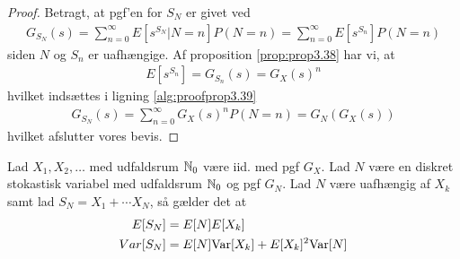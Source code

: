 \begin{proof}
Betragt, at pgf'en for $S_N$ er givet ved
    \begin{align}\label{alg:proofprop3.39}
        G_{S_N}(s)=\sum_{n=0}^{\infty}E\left[s^{S_N} | N=n\right]P(N=n)=\sum_{n=0}^{\infty}E[s^{S_n}]P(N=n)
    \end{align}
siden $N$ og $S_n$ er uafhængige. Af proposition \ref{prop:prop3.38} har vi, at 
    \begin{align*}
        E[s^{S_n}] = G_{S_{n}}(s) =G_X(s)^n
    \end{align*}
    hvilket indsættes i ligning \eqref{alg:proofprop3.39}
    \begin{align*}
        G_{S_N}(s)=\sum_{n=0}^{\infty} G_X(s)^nP(N=n)=G_N(G_X(s)) 
    \end{align*}
    hvilket afslutter vores bevis.
\end{proof}
\begin{prop} \label{prop:cor 3.13} %
Lad $X_1,X_2,\ldots$ med udfaldsrum $\mathbb{N}_0$ være iid. med pgf $G_X$. Lad $N$ være en diskret stokastisk variabel med udfaldsrum $\mathbb{N}_0$ og pgf $G_N$. Lad $N$ være uafhængig af $X_k$ samt lad $S_N=X_1+\cdots X_N$, så gælder det at
\begin{align*}
    E[S_N] &=E[N]E[X_k] \\
    Var[S_N] &=E[N]\textnormal{Var}[X_k]+E[X_k]^2\textnormal{Var}[N]
\end{align*}
\end{prop}

